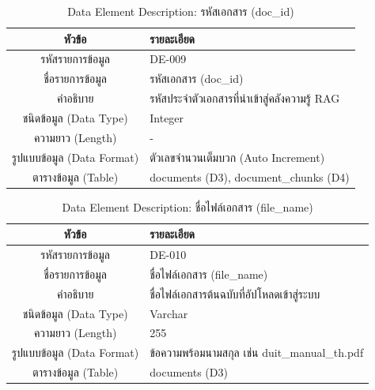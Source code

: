 \begin{table}[htbp]
\centering
\caption{Data Element Description: รหัสเอกสาร (doc\_id)}
\label{tab3:de_doc_id}
\begin{tabularx}{\textwidth}{| c | L |}
\hline
\textbf{หัวข้อ} & \textbf{รายละเอียด} \\ \hline
รหัสรายการข้อมูล & DE-009 \\ \hline
ชื่อรายการข้อมูล & รหัสเอกสาร (doc\_id) \\ \hline
คำอธิบาย & รหัสประจำตัวเอกสารที่นำเข้าสู่คลังความรู้ RAG \\ \hline
ชนิดข้อมูล (Data Type) & Integer \\ \hline
ความยาว (Length) & - \\ \hline
รูปแบบข้อมูล (Data Format) & ตัวเลขจำนวนเต็มบวก (Auto Increment) \\ \hline
ตารางข้อมูล (Table) & documents (D3), document\_chunks (D4) \\ \hline
\end{tabularx}
\end{table}

\begin{table}[htbp]
\centering
\caption{Data Element Description: ชื่อไฟล์เอกสาร (file\_name)}
\label{tab3:de_file_name}
\begin{tabularx}{\textwidth}{| c | L |}
\hline
\textbf{หัวข้อ} & \textbf{รายละเอียด} \\ \hline
รหัสรายการข้อมูล & DE-010 \\ \hline
ชื่อรายการข้อมูล & ชื่อไฟล์เอกสาร (file\_name) \\ \hline
คำอธิบาย & ชื่อไฟล์เอกสารต้นฉบับที่อัปโหลดเข้าสู่ระบบ \\ \hline
ชนิดข้อมูล (Data Type) & Varchar \\ \hline
ความยาว (Length) & 255 \\ \hline
รูปแบบข้อมูล (Data Format) & ข้อความพร้อมนามสกุล เช่น duit\_manual\_th.pdf \\ \hline
ตารางข้อมูล (Table) & documents (D3) \\ \hline
\end{tabularx}
\end{table}

